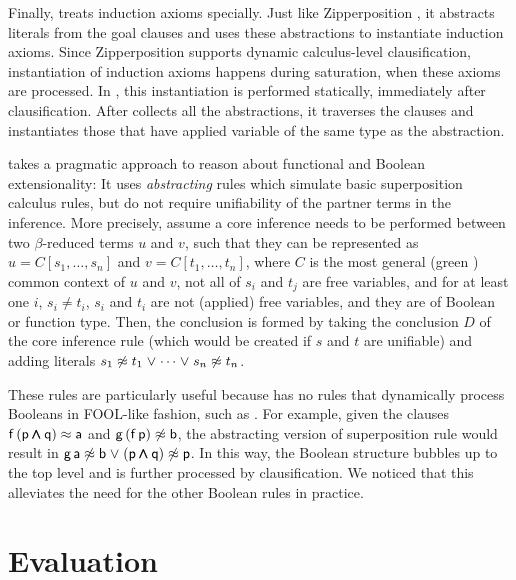 Finally, \ehohii{} treats induction axioms specially. Just like
Zipperposition \cite[Sect.~4]{section-making-ho-work}, it abstracts literals
from the goal clauses and uses these abstractions to instantiate induction
axioms. Since Zipperposition supports dynamic calculus-level clausification,
instantiation of induction axioms happens during saturation, when these axioms
are processed. In \ehohii{}, this instantiation is performed statically,
immediately after clausification. After \ehohii{} collects all the abstractions,
it traverses the clauses and instantiates those that have applied variable of
the same type as the abstraction.

 \ehohii{} takes a pragmatic approach to reason about
functional and Boolean extensionality: It uses \emph{abstracting} rules
\cite{bbtvw-21-sup-lam} which simulate basic superposition calculus rules,
but do not require unifiability of the partner terms in the inference. More
precisely, assume a core inference needs to be performed between two
$\beta$-reduced terms $u$ and $v$, such that they can be represented as
$u=C[s_1, \ldots, s_n]$ and $v=C[t_1, \ldots, t_n]$, where $C$ is the most general
(green \cite{bbtvw-21-sup-lam}) common context of $u$ and $v$, not all of
$s_i$ and $t_j$ are free variables, and for at least one $i$, $s_i \not= t_i$,
$s_i$ and $t_i$ are not (applied) free variables, and they are of Boolean or
function type. Then, the conclusion is formed by taking the conclusion $D$ of
the core inference rule (which would be created if $s$ and $t$ are unifiable)
and adding literals $s_1 \not\approx t_1 \mathrel\lor \cdots \mathrel\lor s_n \not\approx t_n$.

These rules are particularly useful because \ehohii{} has no rules that dynamically
process Booleans in FOOL-like fashion, such as . For example,
given the clauses $\mathsf{f} \, (\mathsf{p} \pmb\land \mathsf{q}) \approx \mathsf{a}$ and
$\mathsf{g} \, (\mathsf{f} \, \mathsf{p}) \not\approx \mathsf{b}$, the abstracting version of
superposition rule would result in $\mathsf{g} \, \mathsf{a} \not\approx \mathsf{b} \mathrel\lor (\mathsf{p}
\pmb\land \mathsf{q}) \not\approx \mathsf{p}$. In this way, the Boolean structure bubbles up to
the top level and is further processed by clausification. We noticed that this
alleviates the need for the other Boolean rules in practice.


\section{Evaluation}
\label{sec:ehoh2:eval}


